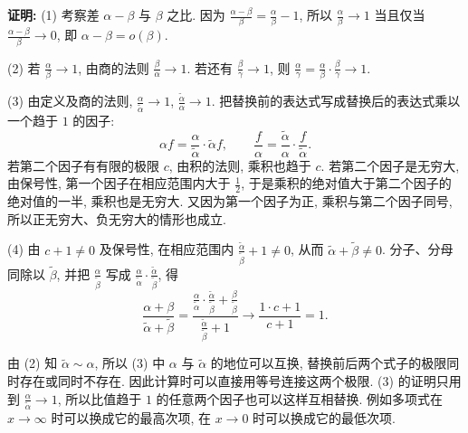 \documentclass[UTF8,openany]{ctexbook}
\theoremstyle{chinesetextbook}
\newenvironment{cnproof}{\par\indent\textbf{证明:} \ignorespaces}{\par}
\begin{document}
\begin{cnproof}
(1) 考察差 $\alpha-\beta$ 与 $\beta$ 之比. 因为 $\displaystyle\frac{\alpha-\beta}\beta=\frac\alpha\beta-1$, 所以 $\displaystyle\frac\alpha\beta\to1$ 当且仅当 $\displaystyle\frac{\alpha-\beta}\beta\to0$, 即 $\alpha-\beta=o(\beta)$.

(2) 若 $\displaystyle\frac\alpha\beta\to1$, 由商的法则 $\displaystyle\frac\beta\alpha\to1$. 若还有 $\displaystyle\frac\beta\gamma\to1$, 则 $\displaystyle\frac\alpha\gamma=\frac\alpha\beta\cdot\frac\beta\gamma\to1$.

(3) 由定义及商的法则, $\displaystyle\frac\alpha{\widetilde\alpha}\to1$, $\displaystyle\frac{\widetilde\alpha}\alpha\to1$. 把替换前的表达式写成替换后的表达式乘以一个趋于 $1$ 的因子:
\[
\alpha f=\frac\alpha{\widetilde\alpha}\cdot\widetilde\alpha f,\qquad\frac f\alpha=\frac{\widetilde\alpha}\alpha\cdot\frac f{\widetilde\alpha}.
\]
若第二个因子有有限的极限 $c$, 由积的法则, 乘积也趋于 $c$. 若第二个因子是无穷大, 由保号性, 第一个因子在相应范围内大于 $\displaystyle\frac12$, 于是乘积的绝对值大于第二个因子的绝对值的一半, 乘积也是无穷大. 又因为第一个因子为正, 乘积与第二个因子同号, 所以正无穷大、负无穷大的情形也成立.

(4) 由 $c+1\ne0$ 及保号性, 在相应范围内 $\displaystyle\frac{\widetilde\alpha}{\widetilde\beta}+1\ne0$, 从而 $\widetilde\alpha+\widetilde\beta\ne0$. 分子、分母同除以 $\widetilde\beta$, 并把 $\displaystyle\frac\alpha{\widetilde\beta}$ 写成 $\displaystyle\frac\alpha{\widetilde\alpha}\cdot\frac{\widetilde\alpha}{\widetilde\beta}$, 得
\[
\frac{\alpha+\beta}{\widetilde\alpha+\widetilde\beta}=\frac{\frac\alpha{\widetilde\alpha}\cdot\frac{\widetilde\alpha}{\widetilde\beta}+\frac\beta{\widetilde\beta}}{\frac{\widetilde\alpha}{\widetilde\beta}+1}\to\frac{1\cdot c+1}{c+1}=1.
\]
\end{cnproof}
由 (2) 知 $\widetilde\alpha\sim\alpha$, 所以 (3) 中 $\alpha$ 与 $\widetilde\alpha$ 的地位可以互换, 替换前后两个式子的极限同时存在或同时不存在. 因此计算时可以直接用等号连接这两个极限. (3) 的证明只用到 $\displaystyle\frac\alpha{\widetilde\alpha}\to1$, 所以比值趋于 $1$ 的任意两个因子也可以这样互相替换. 例如多项式在 $x\to\infty$ 时可以换成它的最高次项, 在 $x\to0$ 时可以换成它的最低次项.
\end{document}
